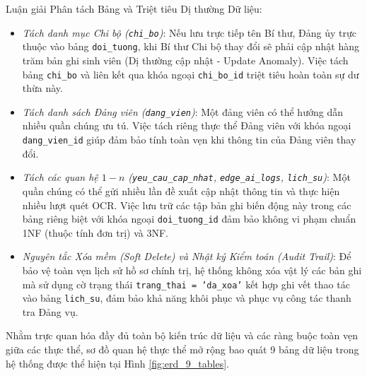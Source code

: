 \documentclass[12pt,a4paper]{report}
\begin{document}
Luận giải Phân tách Bảng và Triệt tiêu Dị thường Dữ liệu:
\begin{itemize}[label=--,leftmargin=*]
  \item \textit{Tách danh mục Chi bộ (\texttt{chi\_bo})}: Nếu lưu trực tiếp tên Bí thư, Đảng ủy trực thuộc vào bảng \texttt{doi\_tuong}, khi Bí thư Chi bộ thay đổi sẽ phải cập nhật hàng trăm bản ghi sinh viên (Dị thường cập nhật - Update Anomaly). Việc tách bảng \texttt{chi\_bo} và liên kết qua khóa ngoại \texttt{chi\_bo\_id} triệt tiêu hoàn toàn sự dư thừa này.
  \item \textit{Tách danh sách Đảng viên (\texttt{dang\_vien})}: Một đảng viên có thể hướng dẫn nhiều quần chúng ưu tú. Việc tách riêng thực thể Đảng viên với khóa ngoại \texttt{dang\_vien\_id} giúp đảm bảo tính toàn vẹn khi thông tin của Đảng viên thay đổi.
  \item \textit{Tách các quan hệ $1 - n$ (\texttt{yeu\_cau\_cap\_nhat}, \texttt{edge\_ai\_logs}, \texttt{lich\_su})}: Một quần chúng có thể gửi nhiều lần đề xuất cập nhật thông tin và thực hiện nhiều lượt quét OCR. Việc lưu trữ các tập bản ghi biến động này trong các bảng riêng biệt với khóa ngoại \texttt{doi\_tuong\_id} đảm bảo không vi phạm chuẩn 1NF (thuộc tính đơn trị) và 3NF.
  \item \textit{Nguyên tắc Xóa mềm (Soft Delete) và Nhật ký Kiểm toán (Audit Trail)}: Để bảo vệ toàn vẹn lịch sử hồ sơ chính trị, hệ thống không xóa vật lý các bản ghi mà sử dụng cờ trạng thái \texttt{trang\_thai = 'da\_xoa'} kết hợp ghi vết thao tác vào bảng \texttt{lich\_su}, đảm bảo khả năng khôi phục và phục vụ công tác thanh tra Đảng vụ.
\end{itemize}

Nhằm trực quan hóa đầy đủ toàn bộ kiến trúc dữ liệu và các ràng buộc toàn vẹn giữa các thực thể, sơ đồ quan hệ thực thể mở rộng bao quát 9 bảng dữ liệu trong hệ thống được thể hiện tại Hình \ref{fig:erd_9_tables}.
\end{document}
